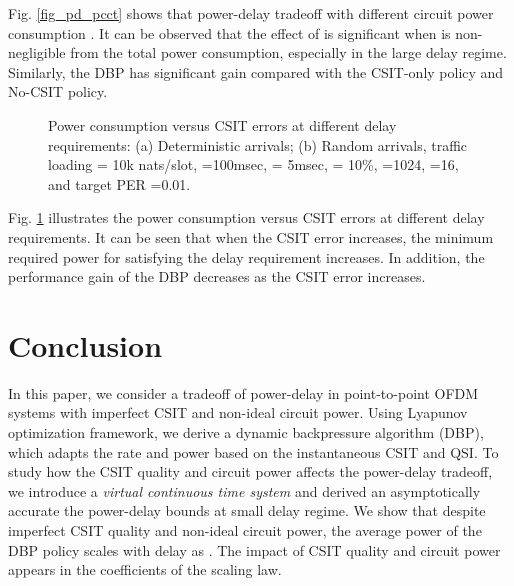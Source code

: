 \documentclass[11pt,journal, onecolumn]{./IEEEtran}
\newcommand{\black}{\color{black}}
\newcommand{\red}{\color{black}}
\begin{document}
\black

{\red Fig. \ref{fig_pd_pcct} shows that power-delay tradeoff with different circuit power consumption . It can be observed that the effect of  is significant when  is non-negligible from the total power consumption, especially in the large delay regime. Similarly, the DBP has significant gain compared with the CSIT-only policy and No-CSIT policy.}







\begin{figure}
\begin{center}
  \end{center}
    \caption{{\red Power consumption versus CSIT errors at different delay requirements: (a) Deterministic arrivals; (b) Random arrivals, traffic loading  =  10k nats/slot, =100msec,  = 5msec,  = 10\%, =1024,  =16, and target PER =0.01.} \black }
    \label{fig_psig} \black
\end{figure}

\black



Fig. \ref{fig_psig} illustrates the power consumption versus CSIT errors at different delay requirements. It can be seen that when the CSIT error  increases, the minimum required power for satisfying the delay requirement increases. In addition, the performance gain of the DBP decreases as the CSIT error increases.




\section{Conclusion}
In this paper, we consider a tradeoff of power-delay in point-to-point OFDM systems with imperfect CSIT and non-ideal circuit power. Using Lyapunov optimization framework, we derive a dynamic backpressure algorithm (DBP), which adapts the rate and power based on the instantaneous CSIT and QSI. To study how the CSIT quality and circuit power affects the power-delay tradeoff, we introduce a {\em virtual continuous time system} and derived an asymptotically accurate the power-delay bounds at small delay regime. We show that despite imperfect CSIT quality and non-ideal circuit power, the average power of the DBP policy scales with delay  as . The impact of CSIT quality and circuit power appears in the coefficients of the scaling law.
\end{document}
